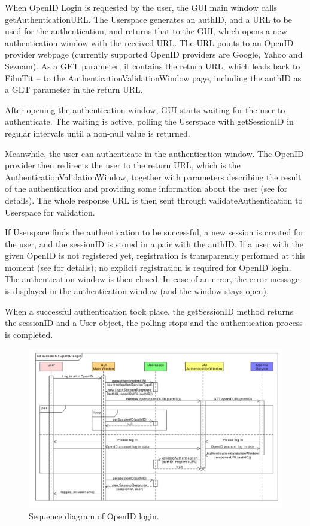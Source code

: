 When OpenID Login is requested by the user, the GUI main window calls getAuthenticationURL.
The Userspace generates an authID, and a URL to be used for the authentication, and returns that to the GUI, which opens a new authentication window with the received URL.
The URL points to an OpenID provider webpage (currently supported OpenID providers are Google, Yahoo and Seznam). As a GET parameter, it contains the return URL, which leads back to FilmTit -- to the AuthenticationValidationWindow page, including the authID as a GET parameter in the return URL.

After opening the authentication window, GUI starts waiting for the user to authenticate. The waiting is active, polling the Userspace with getSessionID in regular intervals until a non-null value is returned.

Meanwhile, the user can authenticate in the authentication window. The OpenID provider then redirects the user to the return URL, which is the AuthenticationValidationWindow, together with parameters describing the result of the authentication and providing some information about the user (see  for details).
The whole response URL is then sent through validateAuthentication to Userspace for validation.

If Userspace finds the authentication to be successful, a new session is created for the user, and the sessionID is stored in a pair with the authID.
If a user with the given OpenID is not registered yet, registration is transparently performed at this moment (see  for details); no explicit registration is required for OpenID login.
The authentication window is then closed.
In case of an error, the error message is displayed in the authentication window (and the window stays open).

When a successful authentication took place, the getSessionID method returns the sessionID and a User object, the polling stops and the authentication process is completed.

\begin{figure}[h]
\begin{center}
\includegraphics[scale=0.55, angle=90]{figures/openid_login_sequence.pdf}
\end{center}
\caption{Sequence diagram of OpenID login.}\label{rpc:sd:openid_login}
\end{figure}
